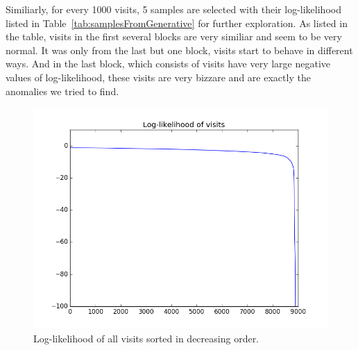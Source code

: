 Similiarly, for every 1000 visits, 5 samples are selected with their log-likelihood listed in Table~\ref{tab:samplesFromGenerative} for further exploration. As listed in the table, visits in the first several blocks are very similiar and seem to be very normal. It was only from the last but one block, visits start to behave in different ways. And in the last block, which consists of visits have very large negative values of log-likelihood, these visits are very bizzare and are exactly the anomalies we tried to find.


\begin{figure}
	\begin{center}
		\includegraphics[width=\textwidth]{images/likelihood}
		\caption{Log-likelihood of all visits sorted in decreasing order.}
		\label{fig:likelihood}
	\end{center}
\end{figure}

